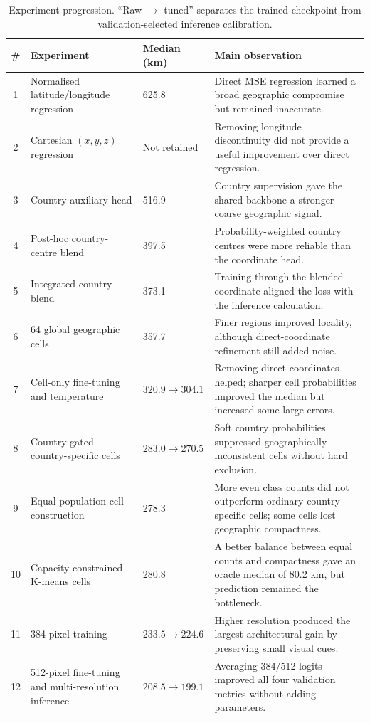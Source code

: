 \documentclass[10pt]{article}
\begin{document}
\begin{table}[h]
\centering
\caption{Experiment progression. ``Raw $\rightarrow$ tuned'' separates the
trained checkpoint from validation-selected inference calibration.}
\label{tab:experiments}
\small
\begin{tabularx}{\textwidth}{@{}c p{} p{} X@{}}
\toprule
\# & Experiment & Median (km) & Main observation \\
\midrule
1 & Normalised latitude/longitude regression & 625.8 & Direct MSE regression learned a broad geographic compromise but remained inaccurate. \\
2 & Cartesian $(x,y,z)$ regression & Not retained & Removing longitude discontinuity did not provide a useful improvement over direct regression. \\
3 & Country auxiliary head & 516.9 & Country supervision gave the shared backbone a stronger coarse geographic signal. \\
4 & Post-hoc country-centre blend & 397.5 & Probability-weighted country centres were more reliable than the coordinate head. \\
5 & Integrated country blend & 373.1 & Training through the blended coordinate aligned the loss with the inference calculation. \\
6 & 64 global geographic cells & 357.7 & Finer regions improved locality, although direct-coordinate refinement still added noise. \\
7 & Cell-only fine-tuning and temperature & $320.9\rightarrow304.1$ & Removing direct coordinates helped; sharper cell probabilities improved the median but increased some large errors. \\
8 & Country-gated country-specific cells & $283.0\rightarrow270.5$ & Soft country probabilities suppressed geographically inconsistent cells without hard exclusion. \\
9 & Equal-population cell construction & 278.3 & More even class counts did not outperform ordinary country-specific cells; some cells lost geographic compactness. \\
10 & Capacity-constrained K-means cells & 280.8 & A better balance between equal counts and compactness gave an oracle median of 80.2 km, but prediction remained the bottleneck. \\
11 & 384-pixel training & $233.5\rightarrow224.6$ & Higher resolution produced the largest architectural gain by preserving small visual cues. \\
12 & 512-pixel fine-tuning and multi-resolution inference & $208.5\rightarrow\mathbf{199.1}$ & Averaging 384/512 logits improved all four validation metrics without adding parameters. \\
\bottomrule
\end{tabularx}
\end{table}
\end{document}

